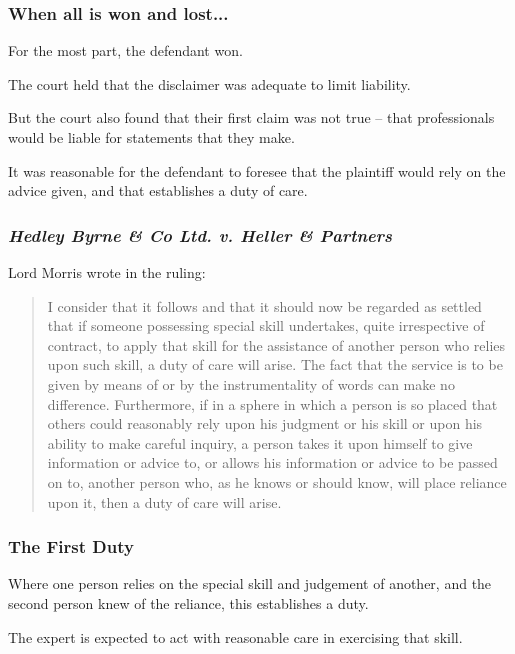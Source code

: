 \begin{frame}
\frametitle{When all is won and lost...}

For the most part, the defendant won.

The court held that the disclaimer was adequate to limit liability.

But the court also found that their first claim was not true -- that professionals would be liable for statements that they make.

It was reasonable for the defendant to foresee that the plaintiff would rely on the advice given, and that establishes a duty of care.

\end{frame}



\begin{frame}
\frametitle{\textit{Hedley Byrne \& Co Ltd. v. Heller \& Partners}}

Lord Morris wrote in the ruling:

\begin{quote}
I consider that it follows and that it should now be regarded as settled that if someone possessing special skill undertakes, quite irrespective of contract, to apply that skill for the assistance of another person who relies upon such skill, a duty of care will arise. The fact that the service is to be given by means of or by the instrumentality of words can make no difference. Furthermore, if in a sphere in which a person is so placed that others could reasonably rely upon his judgment or his skill or upon his ability to make careful inquiry, a person takes it upon himself to give information or advice to, or allows his information or advice to be passed on to, another person who, as he knows or should know, will place reliance upon it, then a duty of care will arise.
\end{quote}


\end{frame}


\begin{frame}
\frametitle{The First Duty}

Where one person relies on the special skill and judgement of another, and the second person knew of the reliance, this establishes a duty.

The expert is expected to act with reasonable care in exercising that skill.

\end{frame}




